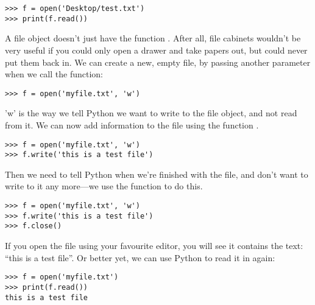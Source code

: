 \begin{LINUX}

\begin{listing}
\begin{verbatim}
>>> f = open('Desktop/test.txt')
>>> print(f.read())
\end{verbatim}
\end{listing}
 
\end{LINUX}

A file object doesn't just have the function . After all, file cabinets wouldn't be very useful if you could only open a drawer and take papers out, but could never put them back in. We can create a new, empty file, by passing another parameter when we call the  function:

\begin{listing}
\begin{verbatim}
>>> f = open('myfile.txt', 'w')
\end{verbatim}
\end{listing}

'w' is the way we tell Python we want to write to the file object, and not read from it.  We can now add information to the file using the function .

\begin{listing}
\begin{verbatim}
>>> f = open('myfile.txt', 'w')
>>> f.write('this is a test file')
\end{verbatim}
\end{listing}

Then we need to tell Python when we're finished with the file, and don't want to write to it any more---we use the function  to do this.

\begin{listing}
\begin{verbatim}
>>> f = open('myfile.txt', 'w')
>>> f.write('this is a test file')
>>> f.close()
\end{verbatim}
\end{listing}

If you open the file using your favourite editor, you will see it contains the text: ``this is a test file''.  Or better yet, we can use Python to read it in again:

\begin{listing}
\begin{verbatim}
>>> f = open('myfile.txt')
>>> print(f.read())
this is a test file
\end{verbatim}
\end{listing}

\newpage
